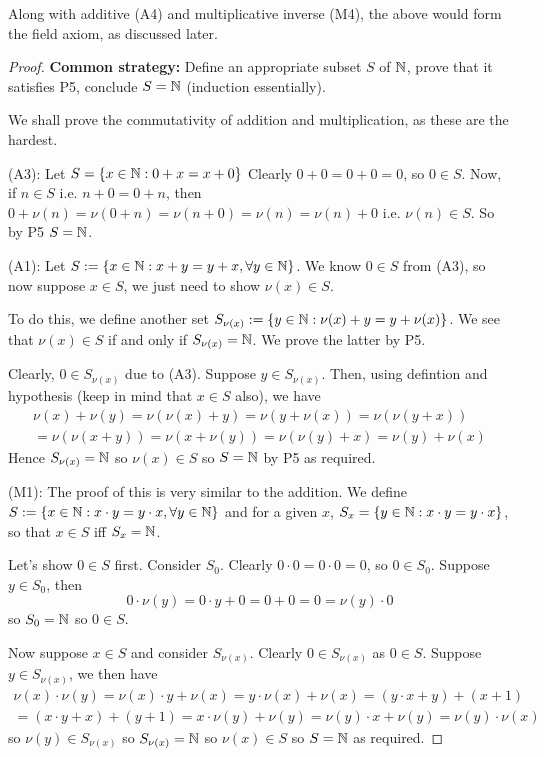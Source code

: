 \documentclass[11pt]{article}
\begin{document}
Along with additive (A4) and multiplicative inverse (M4), the above would form the field axiom, as discussed later.

\begin{proof}
  \textbf{Common strategy:} Define an appropriate subset \(S\) of \(\mathbb{N}\), prove that it satisfies P5, conclude \(S = \mathbb{N}\) (induction essentially).

  We shall prove the commutativity of addition and multiplication, as these are the hardest.
  
  \vspace{5pt}
  (A3): Let \(S = \{x\in \mathbb{N} : 0+x=x+0\}\)
  Clearly \(0+0=0+0=0\), so \(0 \in S\). Now, if \(n \in S\) i.e. \(n+0=0+n\), then \(0+\nu(n) = \nu(0+n)=\nu(n+0) = \nu(n) = \nu(n)+0\) i.e. \(\nu(n) \in S\). So by P5 \(S = \mathbb{N}\).

  \vspace{5pt}
  (A1): Let \(S := \{x\in \mathbb{N} : x+y=y+x, \forall y \in \mathbb{N}\}\). We know \(0 \in S\) from (A3), so now suppose \(x \in S\), we just need to show \(\nu(x) \in S\).

  To do this, we define another set \(S_{\nu(x)} := \{y\in\mathbb{N}:\nu(x)+y=y+\nu(x)\}\). We see that \(\nu(x) \in S\) if and only if \(S_{\nu(x)}=\mathbb{N}\). We prove the latter by P5.

  Clearly, \(0\in S_{\nu(x)}\) due to (A3). Suppose \(y \in S_{\nu(x)}\). Then, using defintion and hypothesis (keep in mind that \(x \in S\) also), we have
  \begin{multline*}
    \nu(x)+\nu(y)=\nu(\nu(x)+y)=\nu(y+\nu(x))=\nu(\nu(y+x)) \\ =\nu(\nu(x+y))=\nu(x+\nu(y))=\nu(\nu(y)+x)=\nu(y)+\nu(x)
  \end{multline*}
  Hence \(S_{\nu(x)} = \mathbb{N}\) so \(\nu(x)\in S\) so \(S=\mathbb{N}\) by P5 as required.

  \vspace{5pt}
  (M1): The proof of this is very similar to the addition. We define \(S:=\{x\in\mathbb{N}:x\cdot y= y\cdot x, \forall y\in \mathbb{N}\}\) and for a given \(x\), \(S_x = \{y\in\mathbb{N}:x\cdot y = y \cdot x\}\), so that \(x \in S\) iff \(S_x=\mathbb{N}\).

  Let's show \(0 \in S\) first. Consider \(S_0\). Clearly \(0 \cdot 0 = 0 \cdot 0 = 0\), so \(0 \in S_0\). Suppose \(y \in S_0\), then \begin{equation*}
    0 \cdot \nu(y) = 0 \cdot y + 0 = 0 + 0 = 0 = \nu(y) \cdot 0 
  \end{equation*}
  so \(S_0 = \mathbb{N}\) so \(0 \in S\).

  Now suppose \(x \in S\) and consider \(S_{\nu(x)}\). Clearly \(0 \in S_{\nu(x)}\) as \(0 \in S\). Suppose \(y \in S_{\nu(x)}\), we then have
  \begin{multline*}
    \nu(x) \cdot \nu(y) = \nu(x) \cdot y + \nu(x) = y \cdot \nu(x) + \nu(x) = (y \cdot x + y) + (x+1) \\ = (x \cdot y + x)+ (y+1) = x \cdot \nu(y) + \nu(y) = \nu(y) \cdot x + \nu(y) = \nu(y) \cdot \nu(x) 
  \end{multline*}
  so \(\nu(y) \in S_{\nu(x)}\) so \(S_{\nu(x)} = \mathbb{N}\) so \(\nu(x) \in S\) so \(S = \mathbb{N}\) as required.


\end{proof}
\end{document}
